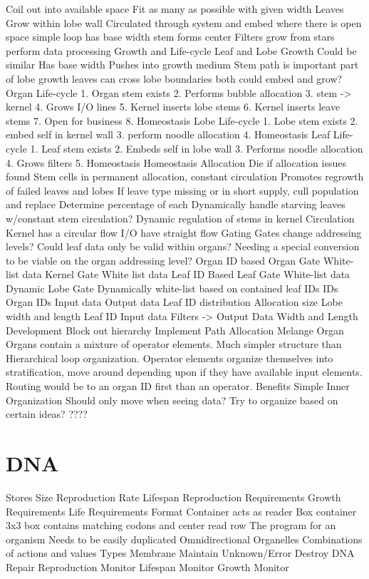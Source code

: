\documentclass[article]{memoir}
\begin{document}
Coil out into available space
Fit as many as possible with given width
Leaves
Grow within lobe wall
Circulated through system and embed where there is open space
simple loop
has base width
stem forms center
Filters grow from stars
perform data processing
Growth and Life-cycle
Leaf and Lobe Growth
Could be similar
Has base width
Pushes into growth medium
Stem path is important part of lobe growth
leaves can cross lobe boundaries
both could embed and grow?
Organ Life-cycle
1. Organ stem exists
2. Performs bubble allocation
3. stem -> kernel
4. Grows I/O lines
5. Kernel inserts lobe stems
6. Kernel inserts leave stems
7. Open for business
8. Homeostasis
Lobe Life-cycle
1. Lobe stem exists
2. embed self in kernel wall
3. perform noodle allocation
4. Homeostasis
Leaf Life-cycle
1. Leaf stem exists
2. Embeds self in lobe wall
3. Performs noodle allocation
4. Grows filters
5. Homeostasis
Homeostasis
Allocation
Die if allocation issues found
Stem cells in permanent allocation, constant circulation
Promotes regrowth of failed leaves and lobes
If leave type missing or in short supply, cull population and replace
Determine percentage of each
Dynamically handle %
starving leaves w/constant stem circulation?
Dynamic regulation of stems in kernel
Circulation
Kernel has a circular flow
I/O have straight flow
Gating
Gates change addressing levels? Could leaf data only be valid within organs? Needing a special conversion to be viable on the organ addressing level?
Organ ID based
Organ Gate
White-list data
Kernel Gate
White list data
Leaf ID Based
Leaf Gate
White-list data
Dynamic
Lobe Gate
Dynamically white-list based on contained leaf IDs
IDs
Organ IDs
Input data
Output data
Leaf ID distribution
Allocation size
Lobe width and length
Leaf ID
Input data
Filters -> Output Data
Width and Length
Development
Block out hierarchy
Implement Path Allocation
Melange Organ
Organs contain a mixture of operator elements. Much simpler structure than Hierarchical loop organization. Operator elements organize themselves into stratification, move around depending upon if they have available input elements.
Routing would be to an organ ID first than an operator.
Benefits
Simple
Inner Organization
Should only move when seeing data? Try to organize based on certain ideas?
????



\section{DNA}
Stores
Size
Reproduction Rate
Lifespan
Reproduction Requirements
Growth Requirements
Life Requirements
Format
Container acts as reader
Box container
3x3 box contains matching codons and center read row
The program for an organism
Needs to be easily duplicated
Omnidirectional
Organelles
Combinations of actions and values
Types
Membrane Maintain
Unknown​/Error Destroy
DNA Repair
Reproduction Monitor
Lifespan Monitor
Growth Monitor
\end{document}
